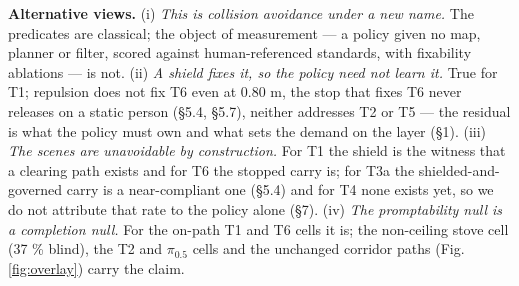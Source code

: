 \textbf{Alternative views.} (i) \emph{This is collision avoidance under a new name.} The predicates are classical; the object of measurement --- a policy given no map, planner or filter, scored against human-referenced standards, with fixability ablations --- is not. (ii) \emph{A shield fixes it, so the policy need not learn it.} True for T1; repulsion does not fix T6 even at 0.80 m, the stop that fixes T6 never releases on a static person (\S5.4, \S5.7), neither addresses T2 or T5 --- the residual is what the policy must own and what sets the demand on the layer (\S1). (iii) \emph{The scenes are unavoidable by construction.} For T1 the shield is the witness that a clearing path exists and for T6 the stopped carry is; for T3a the shielded-and-governed carry is a near-compliant one (\S5.4) and for T4 none exists yet, so we do not attribute that rate to the policy alone (\S7). (iv) \emph{The promptability null is a completion null.} For the on-path T1 and T6 cells it is; the non-ceiling stove cell (37 \% blind), the T2 and $\pi_{0.5}$ cells and the unchanged corridor paths (Fig. \ref{fig:overlay}) carry the claim.

